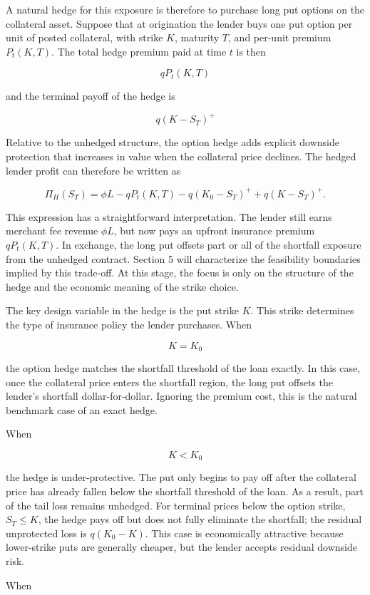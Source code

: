 \documentclass[11pt]{article}
\begin{document}
A natural hedge for this exposure is therefore to purchase long put options on the collateral asset. Suppose that at origination the lender buys one put option per unit of posted collateral, with strike $K$, maturity $T$, and per-unit premium $P_t(K,T)$. The total hedge premium paid at time $t$ is then

$$
qP_t(K,T)
$$

and the terminal payoff of the hedge is

$$
q(K - S_T)^+
$$

Relative to the unhedged structure, the option hedge adds explicit downside protection that increases in value when the collateral price declines. The hedged lender profit can therefore be written as

$$
\Pi_H(S_T)=\phi L-qP_t(K,T)-q(K_0-S_T)^++q(K-S_T)^+.
$$

This expression has a straightforward interpretation. The lender still earns merchant fee revenue $\phi L$, but now pays an upfront insurance premium $qP_t(K,T)$. In exchange, the long put offsets part or all of the shortfall exposure from the unhedged contract. Section 5 will characterize the feasibility boundaries implied by this trade-off. At this stage, the focus is only on the structure of the hedge and the economic meaning of the strike choice.

The key design variable in the hedge is the put strike $K$. This strike determines the type of insurance policy the lender purchases. When

$$
K = K_0
$$

the option hedge matches the shortfall threshold of the loan exactly. In this case, once the collateral price enters the shortfall region, the long put offsets the lender’s shortfall dollar-for-dollar. Ignoring the premium cost, this is the natural benchmark case of an exact hedge.

When

$$
K < K_0
$$

the hedge is under-protective. The put only begins to pay off after the collateral price has already fallen below the shortfall threshold of the loan. As a result, part of the tail loss remains unhedged. For terminal prices below the option strike, $S_T \leq K$, the hedge pays off but does not fully eliminate the shortfall; the residual unprotected loss is $q(K_0-K)$. This case is economically attractive because lower-strike puts are generally cheaper, but the lender accepts residual downside risk.

When
\end{document}
